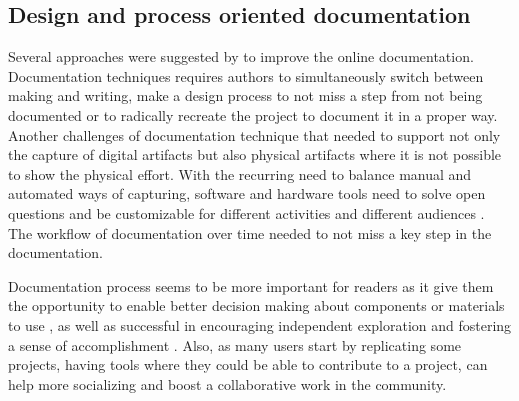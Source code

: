 \subsection{Design and process oriented documentation}
Several approaches were suggested by to improve the online documentation. Documentation techniques requires authors to simultaneously switch between making and writing, make a design process to not miss a step from not being documented or to radically recreate the project to document it in a proper way. Another challenges of documentation technique that needed to support not only the capture of digital artifacts but also physical artifacts where it is not possible to show the physical effort. 
With the recurring need to balance manual and automated ways of capturing, software and hardware tools need to solve open questions and be customizable for different activities and different audiences \cite{Kuznetsov:2010:REA:1868914.1868950}. The workflow of documentation over time needed to not miss a key step in the documentation. 

Documentation process seems to be more important for readers as it give them the opportunity to enable better decision making about components or materials to use \cite{scholar:sf1241364}, as well as successful in encouraging independent exploration and fostering a sense of accomplishment \cite{scholar:lovell2010sewing}. Also, as many users start by replicating some projects, having tools where they could be able to contribute to a project, can help more socializing and boost a collaborative work in the community. 



